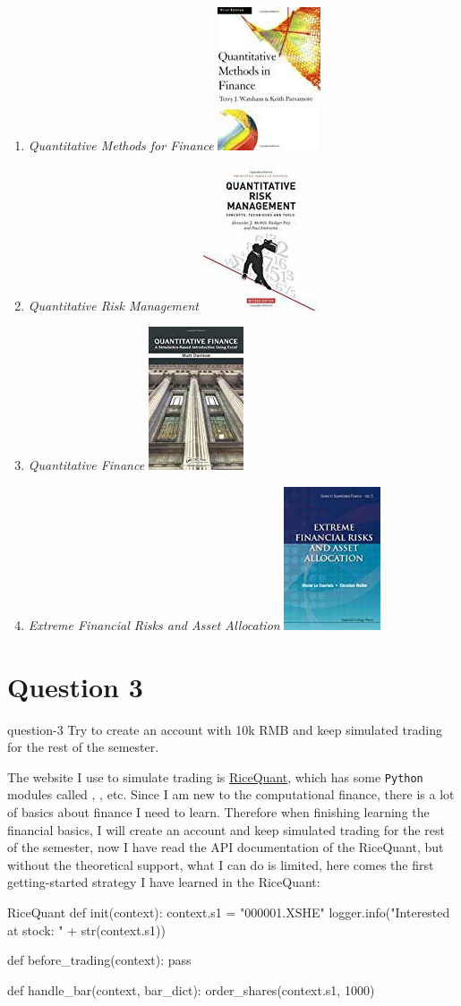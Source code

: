 \begin{enumerate}
    \item \emph{Quantitative Methods for Finance}
        \hfill\includegraphics[height=.5in]{figures/2019-09-17-finance-books-7.jpg}
    \item \emph{Quantitative Risk Management}
        \hfill\includegraphics[height=.5in]{figures/2019-09-17-finance-books-8.jpg}
    \item \emph{Quantitative Finance}
        \hfill\includegraphics[height=.5in]{figures/2019-09-17-finance-books-9.jpg}
    \item \emph{Extreme Financial Risks and Asset Allocation}
        \hfill\includegraphics[height=.5in]{figures/2019-09-17-finance-books-10.jpg}
\end{enumerate}



\section{Question 3}\label{S:3}
\begin{statebox}{}{question-3}
    Try to create an account with 10k RMB and keep simulated trading for the rest of the semester.
\end{statebox}
The website I use to simulate trading is \href{https://www.ricequant.com/quant/}{RiceQuant}, which has some \texttt{Python} modules called , , etc. Since I am new to the computational finance, there is a lot of basics about finance I need to learn. Therefore when finishing learning the financial basics, I will create an account and keep simulated trading for the rest of the semester, now I have read the API documentation of the RiceQuant, but without the theoretical support, what I can do is limited, here comes the first getting-started strategy I have learned in the RiceQuant:
\begin{pylist}{RiceQuant}
def init(context):
    context.s1 = "000001.XSHE"
    logger.info("Interested at stock: " + str(context.s1))

def before_trading(context):
    pass

def handle_bar(context, bar_dict):
    order_shares(context.s1, 1000)
\end{pylist}\label{C:rice-quant-getting-started}

